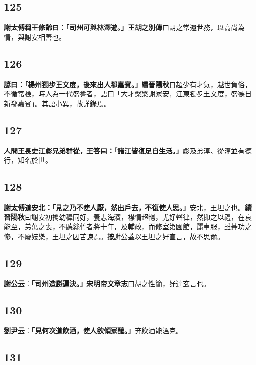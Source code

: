 \subsection*{125}

\textbf{謝太傅稱王修齡曰：「司州可與林澤遊。」}{\footnotesize \textbf{王胡之別傳}曰胡之常遺世務，以高尚為情，與謝安相善也。}

\subsection*{126}

\textbf{諺曰：「楊州獨步王文度，後來出人郗嘉賓。」}{\footnotesize \textbf{續晉陽秋}曰超少有才氣，越世負俗，不循常檢，時人為一代盛譽者，語曰「大才槃槃謝家安，江東獨步王文度，盛德日新郗嘉賓」。其語小異，故詳錄焉。}

\subsection*{127}

\textbf{人問王長史江虨兄弟群從，王答曰：「諸江皆復足自生活。」}{\footnotesize 虨及弟淳、從灌並有德行，知名於世。}

\subsection*{128}

\textbf{謝太傅道安北：「見之乃不使人厭，然出戶去，不復使人思。」}{\footnotesize 安北，王坦之也。\textbf{續晉陽秋}曰謝安初攜幼穉同好，養志海濱，襟情超暢，尤好聲律，然抑之以禮，在哀能至，弟萬之喪，不聽絲竹者將十年，及輔政，而修室第園館，麗車服，雖朞功之慘，不廢妓樂，王坦之因苦諫焉。\textbf{按}謝公蓋以王坦之好直言，故不思爾。}

\subsection*{129}

\textbf{謝公云：「司州造勝遍決。」}{\footnotesize \textbf{宋明帝文章志}曰胡之性簡，好達玄言也。}

\subsection*{130}

\textbf{劉尹云：「見何次道飲酒，使人欲傾家釀。」}{\footnotesize 充飲酒能溫克。}

\subsection*{131}


